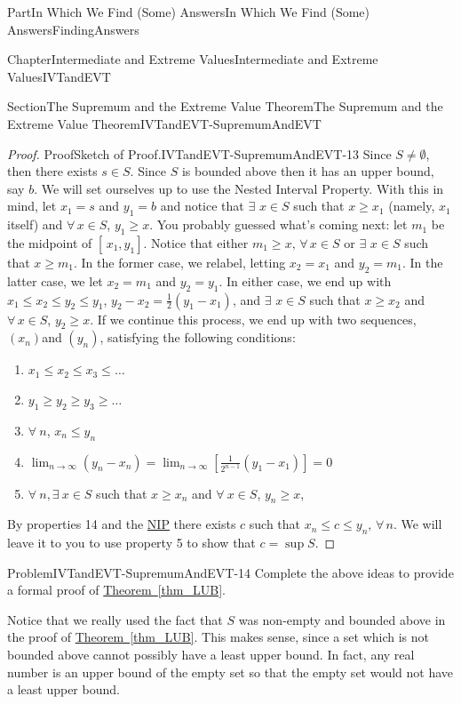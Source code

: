 \documentclass[oneside,10pt,]{book}
\newcommand{\xreffont}{\relax}
\numberwithin{equation}{part}
\def\limit#1#2#3{{\displaystyle\lim_{#1\rightarrow #2}#3}}
\begin{document}
\begin{partptx}{Part}{In Which We Find (Some) Answers}{}{In Which We Find (Some) Answers}{}{}{FindingAnswers}
\begin{chapterptx}{Chapter}{Intermediate and Extreme Values}{}{Intermediate and Extreme Values}{}{}{IVTandEVT}
\begin{sectionptx}{Section}{The Supremum and the Extreme Value Theorem}{}{The Supremum and the Extreme Value Theorem}{}{}{IVTandEVT-SupremumAndEVT}
\begin{proof}{Proof}{Sketch of Proof.}{IVTandEVT-SupremumAndEVT-13}
Since \(S\neq\emptyset\), then there exists \(s\in S\). Since \(S\) is bounded above then it has an upper bound, say \(b\). We will set ourselves up to use the Nested Interval Property. With this in mind, let \(x_1=s\) and \(y_1=b\) and notice that \(\exists\) \(x\in S\) such that \(x\geq x_1\) (namely, \(x_1\) itself) and \(\forall\,x\in S\), \(y_1\geq x\). You probably guessed what's coming next: let \(m_1\) be the midpoint of \([\,x_1,y_1]\). Notice that either \(m_1\geq x,\,\forall\,x\in S\) or \(\exists\) \(x\in S\) such that \(x\geq m_1\). In the former case, we relabel, letting \(x_2=x_1\) and \(y_2=m_1\). In the latter case, we let \(x_2=m_1\) and \(y_2=y_1\). In either case, we end up with \(x_1\leq x_2\leq y_2\leq y_1\), \(y_2-x_2=\frac{1}{2}\left(y_1-x_1\right)\), and \(\exists\) \(x\in S\) such that \(x\geq x_2\) and \(\forall\,x\in S\), \(y_2\geq x\). If we continue this process, we end up with two sequences, \(\left(x_n\right)\)and \(\left(y_n\right)\), satisfying the following conditions:%
\begin{enumerate}
\item{}\(\displaystyle x_1\leq x_2\leq x_3\leq\ldots\)%
\item{}\(\displaystyle y_1\geq y_2\geq y_3\geq\ldots\)%
\item{}\(\forall\ n\), \(x_n\leq y_n\)%
\item{}\(\displaystyle \limit{n}{\infty}{\left(y_n-x_n\right)}=\limit{n}{\infty}{
\left[\frac{1}{2^{n-1}}\left(y_1-x_1\right)\right]}=0\)%
\item{}\(\forall\ n,\exists\ x\in S\) such that \(x\geq x_n\) and \(\forall\ x\in S\), \(y_n\geq x\),%
\end{enumerate}
%
\par
By properties 1\textendash{}4 and the \hyperref[NIP]{NIP}  there exists \(c\) such that \(x_n\leq c\leq y_n,\,\forall\,n\). We will leave it to you to use property 5 to show that \(c=\sup S\).%
\end{proof}
\begin{problem}{Problem}{}{IVTandEVT-SupremumAndEVT-14}%
Complete the above ideas to provide a formal proof of \hyperref[thm_LUB]{Theorem~{\xreffont\ref{thm_LUB}}}.%
\end{problem}
Notice that we really used the fact that \(S\) was non-empty and bounded above in the proof of \hyperref[thm_LUB]{Theorem~{\xreffont\ref{thm_LUB}}}. This makes sense, since a set which is not bounded above cannot possibly have a least upper bound. In fact, any real number is an upper bound of the empty set so that the empty set would not have a least upper bound.%

\end{sectionptx}
\end{chapterptx}
\end{partptx}
\end{document}
